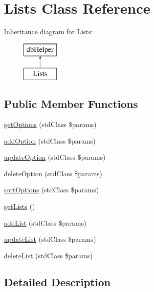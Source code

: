 \hypertarget{class_lists}{\section{\-Lists \-Class \-Reference}
\label{class_lists}
}
\-Inheritance diagram for \-Lists\-:\begin{figure}[H]
\begin{center}
\leavevmode
\includegraphics[height=2.000000cm]{class_lists}
\end{center}
\end{figure}
\subsection*{\-Public \-Member \-Functions}
\begin{DoxyCompactItemize}
\item 
\hyperlink{class_lists_a33500610cc99c061a4eb5bc7b0542575}{get\-Options} (std\-Class \$params)
\item 
\hyperlink{class_lists_a0a90d28cb3c7100831a28d60b3175a14}{add\-Option} (std\-Class \$params)
\item 
\hyperlink{class_lists_a62977c807efcf463d9f759c732ebc7a4}{update\-Option} (std\-Class \$params)
\item 
\hyperlink{class_lists_a6b9603cc7914bfe3356106d2da37e310}{delete\-Option} (std\-Class \$params)
\item 
\hyperlink{class_lists_a96eaec7f86e1e9a8f0d3d660211676aa}{sort\-Options} (std\-Class \$params)
\item 
\hyperlink{class_lists_adadacf20e7598ae5f167f888b2e7aa3c}{get\-Lists} ()
\item 
\hyperlink{class_lists_a02e6dce565be1a44f00615aeb490b00e}{add\-List} (std\-Class \$params)
\item 
\hyperlink{class_lists_a94c7078afe16fbb234aed71e2ce20d9a}{update\-List} (std\-Class \$params)
\item 
\hyperlink{class_lists_a71e9f0574ceaa94bda8492d95902e7ef}{delete\-List} (std\-Class \$params)
\end{DoxyCompactItemize}


\subsection{\-Detailed \-Description}


